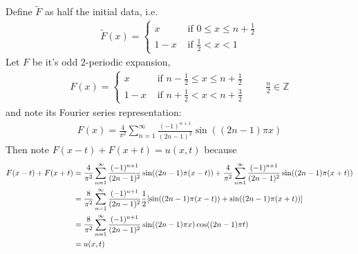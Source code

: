\begin{enumerate}[\bf (a)]
        Define $\tilde{F}$ as half the initial data, i.e.
        \begin{align*}
            \tilde{F}(x) = \begin{cases}
                x & \text{ if } 0 \leq x \leq n + \frac{1}{2} \\
                1 - x & \text{ if } \frac{1}{2} < x < 1
            \end{cases}
        \end{align*}
        Let $F$ be it's odd $2$-periodic expansion,
        \begin{align*}
            F(x) = \begin{cases}
                x & \text{ if } n - \frac{1}{2} \leq x \leq n + \frac{1}{2} \\
                1 - x & \text{ if } n + \frac{1}{2} < x < n + \frac{3}{2}
            \end{cases} \qquad \frac{n}{2} \in \mathbb{Z}
        \end{align*}
        and note its Fourier series representation:
        \begin{align*}
            F(x) = \frac{4}{\pi^2}\sum_{n=1}^\infty \frac{(-1)^{n+1}}{(2n-1)^2}\sin((2n-1)\pi x)
        \end{align*}
        Then note $F(x - t) + F(x + t) = u(x,t)$ because
        \begin{align*}
            F(x - t) + F(x + t) &= \frac{4}{\pi^2}\sum_{n=1}^\infty \frac{(-1)^{n+1}}{(2n-1)^2}\sin((2n-1)\pi (x - t)) + \frac{4}{\pi^2}\sum_{n=1}^\infty \frac{(-1)^{n+1}}{(2n-1)^2}\sin((2n-1)\pi (x + t)) \\
            &= \frac{8}{\pi^2}\sum_{n=1}^\infty \frac{(-1)^{n+1}}{(2n-1)^2}\frac{1}{2}\qty[\sin((2n-1)\pi(x-t)) + \sin((2n-1)\pi(x+t))] \\
            &= \frac{8}{\pi^2}\sum_{n=1}^\infty \frac{(-1)^{n+1}}{(2n-1)^2}\sin((2n-1)\pi x)\cos((2n-1)\pi t) \\
            &= u(x,t)
        \end{align*}
\end{enumerate}
